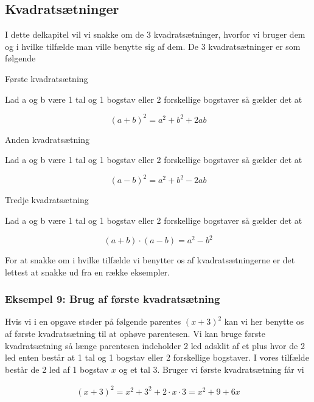 \subsection{Kvadratsætninger}

I dette delkapitel vil vi snakke om de 3 kvadratsætninger, hvorfor vi bruger dem og i hvilke tilfælde man ville benytte sig af dem. De 3 kvadratsætninger er som følgende

\begin{frm-thm}{Første kvadratsætning}

Lad a og b være 1 tal og 1 bogstav eller 2 forskellige bogstaver så gælder det at

\[(a + b)^2 = a^2 + b^2 + 2ab\]
\end{frm-thm}

\begin{frm-thm}{Anden kvadratsætning}

Lad a og b være 1 tal og 1 bogstav eller 2 forskellige bogstaver så gælder det at

\[(a - b)^2 = a^2 + b^2 - 2ab\]
\end{frm-thm}

\begin{frm-thm}{Tredje kvadratsætning}

Lad a og b være 1 tal og 1 bogstav eller 2 forskellige bogstaver så gælder det at

\[(a + b)\cdot (a - b) = a^2 - b^2\]
\end{frm-thm}

For at snakke om i hvilke tilfælde vi benytter os af kvadratsætningerne er det lettest at snakke ud fra en række eksempler.

\subsubsection*{Eksempel 9: Brug af første kvadratsætning}
Hvis vi i en opgave støder på følgende parentes $(x + 3)^2$ kan vi her benytte os af første kvadratsætning til at ophøve parentesen. Vi kan bruge første kvadratsætning så længe parentesen indeholder 2 led adsklit af et plus hvor de 2 led enten består at 1 tal og 1 bogstav eller 2 forskellige bogstaver. I vores tilfælde består de 2 led af 1 bogstav $x$ og et tal $3$. Bruger vi første kvadratsætning får vi

\begin{align*}
(x + 3)^2 = x^2 + 3^2 + 2\cdot x\cdot 3 = x^2 + 9 + 6x
\end{align*}

